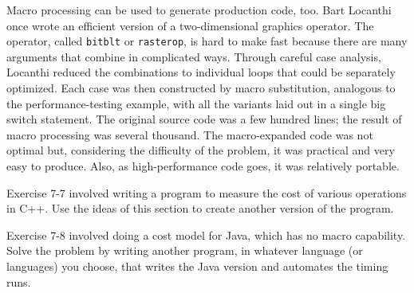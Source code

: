 Macro processing can be used to generate production code, too. Bart
Locanthi once wrote an efficient version of a two-dimensional graphics
operator. The operator, called \verb'bitblt' or \verb'rasterop', is hard to
make fast because there are many arguments that combine in complicated
ways. Through careful case analysis, Locanthi reduced the combinations to
individual loops that could be separately optimized.  Each case was then
constructed by macro substitution, analogous to the performance-testing
example, with all the variants laid out in a single big switch statement.
The original source code was a few hundred lines; the result of macro
processing was several thousand. The macro-expanded code was not optimal
but, considering the difficulty of the problem, it was practical and very
easy to produce. Also, as high-performance code goes, it was relatively
portable.

\begin{exercise}
    Exercise 7-7 involved writing a program to
    measure the cost of various operations in C++. Use the ideas of this
    section to create another version of the program.
\end{exercise}

\begin{exercise}
    Exercise 7-8 involved doing a cost model for
    Java, which has no macro capability. Solve the problem by writing
    another program, in whatever language (or languages) you choose, that
    writes the Java version and automates the timing runs.
\end{exercise}
